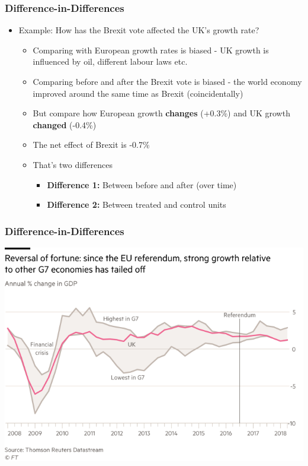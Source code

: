 \documentclass[xcolor=x11names,compress]{beamer}\usepackage[]{graphicx}\usepackage[]{color}
\renewcommand{\(}{\begin{columns}}
\renewcommand{\)}{\end{columns}}
\newcommand{\<}[1]{\begin{column}{#1}}
\renewcommand{\>}{\end{column}}
\begin{document}
\begin{frame}
\frametitle{Difference-in-Differences}
\begin{itemize}
\item Example: How has the Brexit vote affected the UK's growth rate?
\pause
\begin{itemize}
\item Comparing with European growth rates is biased - UK growth is influenced by oil, different labour laws etc.
\pause
\item Comparing before and after the Brexit vote is biased - the world economy improved around the same time as Brexit (coincidentally)
\pause
\item But compare how European growth \textbf{changes} (+0.3\%) and UK growth \textbf{changed} (-0.4\%)
\pause
\item The net effect of Brexit is -0.7\%
\pause
\item That's two differences
\begin{itemize}
\item \textbf{Difference 1:} Between before and after (over time)
\item \textbf{Difference 2:} Between treated and control units
\pause
\end{itemize}
\end{itemize}
\end{itemize}
\end{frame}

\begin{frame}
\frametitle{Difference-in-Differences}
\begin{center}
\includegraphics[scale=0.7]{UK_EU_Growth.png}
\end{center}
\end{frame}
\end{document}
